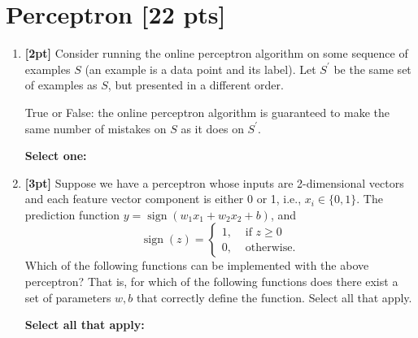 \section{Perceptron [22 pts]}
\begin{enumerate}
    \item \textbf{[2pt]} Consider running the online perceptron algorithm on some sequence of examples $S$ (an example is a data point and its label). Let $S^\prime$ be the same set of examples as $S$, but presented in a different order.
    
    True or False: the online perceptron algorithm is guaranteed to make the same number of mistakes on $S$ as it does on $S^\prime$.

    \textbf{Select one:}


    
    \item \textbf{[3pt]} Suppose we have a perceptron whose inputs are 2-dimensional vectors and each feature vector component is either 0 or 1, i.e., $x_i \in \{0,1\}$. The prediction function $y = \operatorname{sign}(w_1x_1 + w_2x_2 + b)$, and
    $$
    \operatorname{sign}(z) = 
    \begin{cases}
    1, & \textrm{ if } z \geq 0\\
    0, & \textrm{ otherwise}.
    \end{cases}
    $$
    Which of the following functions can be implemented with the above perceptron? That is, for which of the following functions does there exist a set of parameters $w,b$ that correctly define the function. Select all that apply.
    
    \textbf{Select all that apply:}


\end{enumerate}
